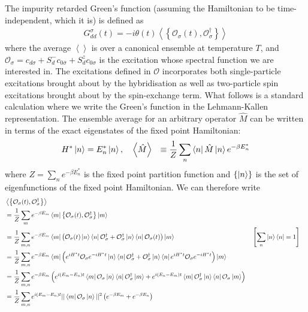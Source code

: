\documentclass[reprint,hidelinks,onecolumn]{revtex4-2}
\begin{document}
\label{appx-spectral-func}
The impurity retarded Green's function (assuming the Hamiltonian to be time-independent, which it is) is defined as
\begin{equation}\begin{aligned}
	G_{dd}^\sigma(t) = -i\theta(t) \left<\left\{ \mathcal{O}_{\sigma}(t),\mathcal{O}^\dagger_{\sigma} \right\}  \right>
\end{aligned}\end{equation}
where the average \(\left< \right>\) is over a canonical ensemble at temperature \(T\), and \(\mathcal{O}_\sigma = c_{d\sigma} + S_d^- c_{0\overline\sigma} + S_d^z c_{0\sigma}\) is the excitation whose spectral function we are interested in. The excitations defined in \(\mathcal{O}\) incorporates both single-particle excitations brought about by the hybridisation as well as two-particle spin excitations brought about by the spin-exchange term. What follows is a standard calculation where we write the Green's function in the Lehmann-Kallen representation. The ensemble average for an arbitrary operator \(\hat M\) can be written in terms of the exact eigenstates of the fixed point Hamiltonian:
\begin{equation}\begin{aligned}
	H^* \ket{n} &= E_n^* \ket{n}, ~ ~ ~\left<\hat M \right> &\equiv \frac{1}{Z}\sum_n \bra{n} \hat M \ket{n} e^{-\beta E_n^*}
\end{aligned}\end{equation}
where \(Z = \sum_n e^{-\beta E_n^*}\) is the fixed point partition function and \(\left\{ \ket{n} \right\} \) is the set of eigenfunctions of the fixed point Hamiltonian. We can therefore write
\begin{equation}\begin{aligned}
	&\left<\left\{ \mathcal{O}_{\sigma}(t),\mathcal{O}^\dagger_{\sigma} \right\}  \right> \\
	&= \frac{1}{Z}\sum_{m}e^{-\beta E_m}\bra{m}\left\{ \mathcal{O}_{\sigma}(t),\mathcal{O}^\dagger_{\sigma} \right\} \ket{m}\\
	&= \frac{1}{Z}\sum_{m,n}e^{-\beta E_m}\bra{m}\left( \mathcal{O}_{\sigma}(t)\ket{n}\bra{n}\mathcal{O}^\dagger_{\sigma} + \mathcal{O}^\dagger_{\sigma}\ket{n}\bra{n}\mathcal{O}_{\sigma}(t)\right) \ket{m} && \left[\sum_n \ket{n}\bra{n} = 1\right]  \\
	&= \frac{1}{Z}\sum_{m,n}e^{-\beta E_m}\bra{m}\left( e^{iH^* t}\mathcal{O}_{\sigma}e^{-iH^* t}\ket{n}\bra{n}\mathcal{O}^\dagger_{\sigma} + \mathcal{O}^\dagger_{\sigma}\ket{n}\bra{n}e^{iH^* t}\mathcal{O}_{\sigma}e^{-iH^* t}\right) \ket{m}\\
	&= \frac{1}{Z}\sum_{m,n}e^{-\beta E_m}\left( e^{i\left( E_m - E_n \right)  t}\bra{m}\mathcal{O}_{\sigma}\ket{n}\bra{n}\mathcal{O}^\dagger_{\sigma} \ket{m} + e^{i\left( E_n - E_m \right)  t}\bra{m}\mathcal{O}^\dagger_{\sigma}\ket{n}\bra{n}\mathcal{O}_{\sigma} \ket{m}\right)\\
	&= \frac{1}{Z}\sum_{m,n}e^{i\left( E_m - E_n \right)  t}||\bra{m}\mathcal{O}_{\sigma}\ket{n}||^2\left( e^{-\beta E_m} + e^{-\beta E_n}\right)\\
\end{aligned}\end{equation}
\end{document}
